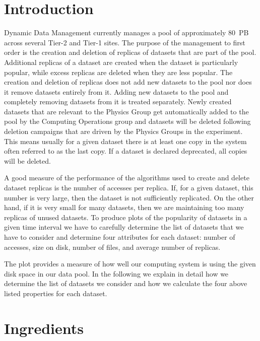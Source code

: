 \tableofcontents

\section{Introduction}\label{sec:introduction}

Dynamic Data Management currently manages a pool of approximately 80~PB across
several Tier-2 and Tier-1 sites. The purpose of the management to first order is
the creation and deletion of replicas of datasets that are part of the pool.
Additional replicas of a dataset are created when the dataset is particularly
popular, while excess replicas are deleted when they are less popular. The
creation and deletion of replicas does not add new datasets to the pool nor does
it remove datasets entirely from it. Adding new datasets to the pool and
completely removing datasets from it is treated separately. Newly created
datasets that are relevant to the Physics Group get automatically added to the
pool by the Computing Operations group and datasets will be deleted following
deletion campaigns that are driven by the Physics Groups in the experiment.
This means usually for a given dataset there is at least one copy in the system
often referred to as the last copy. If a dataset is declared deprecated, all
copies will be deleted.

A good measure of the performance of the algorithms used to create and delete
dataset replicas is the number of accesses per replica. If, for a given dataset,
this number is very large, then the dataset is not sufficiently replicated. On
the other hand, if it is very small for many datasets, then we are maintaining
too many replicas of unused datasets. To produce plots of the popularity of
datasets in a given time interval we have to carefully determine the list of
datasets that we have to consider and determine four attributes for each
dataset: number of accesses, size on disk, number of files, and average number
of replicas.

The plot provides a measure of how well our computing system is using the given
disk space in our data pool. In the following we explain in detail how we
determine the list of datasets we consider and how we calculate the four above
listed properties for each dataset.

\section{Ingredients}

